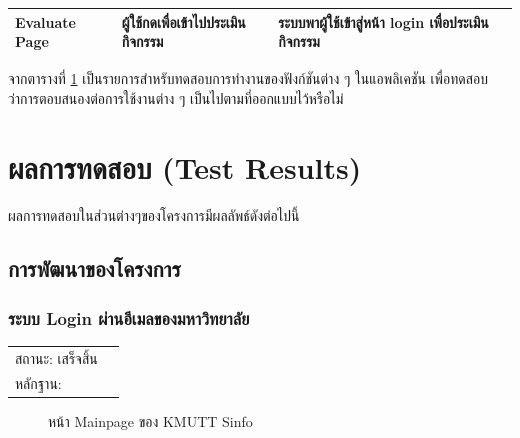 \documentclass[14pt,oneside,openright,a4paper]{cpe-thai-project}
\begin{document}
\begin{table}[!h]
\begin{tabular}{|l|p{3cm}|p{5cm}|p{3cm}|}
  \hline
  Evaluate Page & ผู้ใช้กดเพื่อเข้าไปประเมินกิจกรรม & ระบบพาผู้ใช้เข้าสู่หน้า login เพื่อประเมินกิจกรรม & \\
  \hline
  \end{tabular}
  \label{tab:functionaltesting}
  จากตารางที่ \ref{tab:functionaltesting} เป็นรายการสำหรับทดสอบการทำงานของฟังก์ชันต่าง ๆ ในแอพลิเคชัน เพื่อทดสอบว่าการตอบสนองต่อการใช้งานต่าง ๆ เป็นไปตามที่ออกแบบไว้หรือไม่
\end{table}

\newpage
\section{ผลการทดสอบ (Test Results)}
ผลการทดสอบในส่วนต่างๆของโครงการมีผลลัพธ์ดังต่อไปนี้
\subsection{การพัฒนาของโครงการ}
\subsubsection{ระบบ Login ผ่านอีเมลของมหาวิทยาลัย}
\begin{tabular}{@{}p{2cm}p{10cm}@{}}
  สถานะ: เสร็จสิ้น \\
  หลักฐาน: & \\
  \end{tabular}
\begin{figure}[!h]\centering
  \setlength{\fboxrule}{0.5mm} %
  \setlength{\fboxsep}{0.5cm}
  \caption{หน้า Mainpage ของ KMUTT Sinfo}\label{fig:sinfo}
\end{figure}
\newpage
\end{document}
